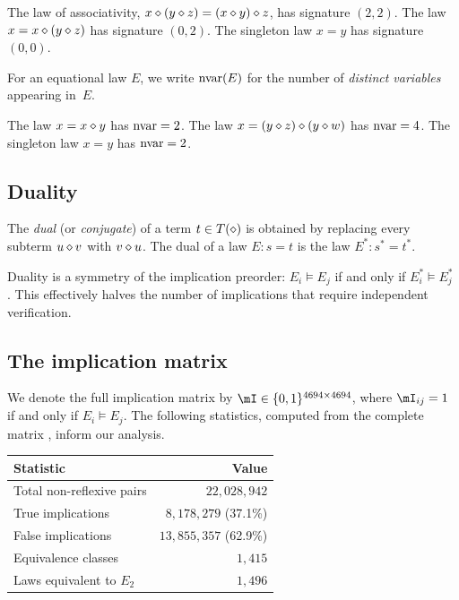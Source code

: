 \begin{example}\label{ex:signatures}
The law of associativity, $x \diamond (y \diamond z) = (x \diamond y) \diamond z$, has signature
$(2, 2)$.  The law $x = x \diamond (y \diamond z)$ has signature $(0, 2)$.  The
singleton law $x = y$ has signature $(0, 0)$.
\end{example}

\begin{definition}\label{def:nvar}
For an equational law $E$, we write $\mathrm{nvar}(E)$ for the number of
\emph{distinct variables} appearing in~$E$.
\end{definition}

\begin{example}\label{ex:nvar}
The law $x = x \diamond y$ has $\mathrm{nvar} = 2$.  The law
$x = (y \diamond z) \diamond (y \diamond w)$ has $\mathrm{nvar} = 4$.  The singleton law $x = y$
has $\mathrm{nvar} = 2$.
\end{example}

\subsection{Duality}

\begin{definition}\label{def:duality}
The \emph{dual} (or \emph{conjugate}) of a term $t \in T(\diamond)$ is obtained by
replacing every subterm $u \diamond v$ with $v \diamond u$.  The dual of a law
$E \colon s = t$ is the law $E^* \colon s^* = t^*$.
\end{definition}

Duality is a symmetry of the implication preorder: $E_i \models E_j$ if and
only if $E_i^* \models E_j^*$ \cite{ETP2025}.  This effectively halves the
number of implications that require independent verification.

\subsection{The implication matrix}

We denote the full implication matrix by $\mI \in \{0, 1\}^{4694 \times 4694}$,
where $\mI_{ij} = 1$ if and only if $E_i \models E_j$.  The following
statistics, computed from the complete matrix \cite{ETP2025}, inform our
analysis.

\begin{center}
\begin{tabular}{@{}lr@{}}
\toprule
Statistic & Value \\
\midrule
Total non-reflexive pairs & $22{,}028{,}942$ \\
True implications & $8{,}178{,}279$ (37.1\%) \\
False implications & $13{,}855{,}357$ (62.9\%) \\
Equivalence classes & $1{,}415$ \\
Laws equivalent to $E_2$ & $1{,}496$ \\
\bottomrule
\end{tabular}
\end{center}
